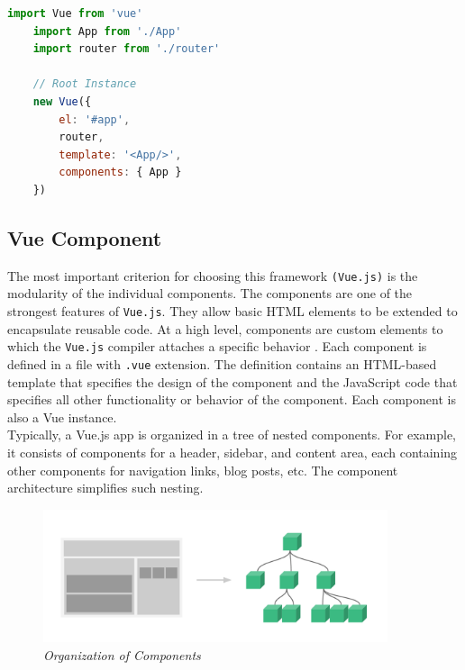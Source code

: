 \begin{lstlisting}[language=JavaScript, caption=main.js]
    import Vue from 'vue'
    import App from './App'
    import router from './router'

    // Root Instance
    new Vue({
        el: '#app',
        router,
        template: '<App/>',
        components: { App }
    })

\end{lstlisting}

\subsection{Vue Component}
\label{Vue:Component}
The most important criterion for choosing this framework \texttt{(Vue.js)} is the modularity of the individual components. The components are one of the strongest features of \texttt{Vue.js}. They allow basic HTML elements to be extended to encapsulate reusable code. At a high level, components are custom elements to which the \texttt{Vue.js} compiler attaches a specific behavior \cite{Vue019:Intro:Online}. Each component is defined in a file with \texttt{.vue} extension. The definition contains an HTML-based template that specifies the design of the component and the JavaScript code that specifies all other functionality or behavior of the component. Each component is also a Vue instance.\\

Typically, a Vue.js app is organized in a tree of nested components. For example, it consists of components for a header, sidebar, and content area, each containing other components for navigation links, blog posts, etc. The component architecture simplifies such nesting.

\begin{figure}[H]
  \centering
  \includegraphics[width=0.9\textwidth]{Bilder/img/components.png}  
  \caption{ \textit{Organization of Components} \cite{VueComponents:Online}}%
\label{fig:OrganisationvonKomponenten}
\end{figure}

